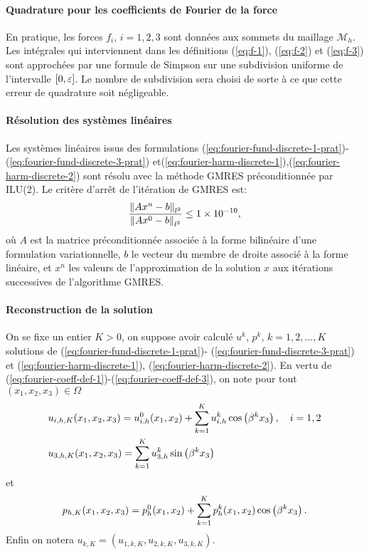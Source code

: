 \paragraph{Quadrature pour les coefficients de Fourier de la force}
En pratique, les forces $f_i$, $i = 1,2,3$ sont données aux sommets du
maillage $\mathcal M_h$. Les intégrales qui interviennent dans les
définitions (\ref{eq:f-1}), (\ref{eq:f-2}) et (\ref{eq:f-3}) sont
approchées par une formule de Simpson sur une subdivision uniforme de
l'intervalle $[0, \varepsilon]$. Le nombre de subdivision sera choisi
de sorte à ce que cette erreur de quadrature soit négligeable.

\paragraph{Résolution des systèmes linéaires}
Les systèmes linéaires issus des formulations
(\ref{eq:fourier-fund-discrete-1-prat})-(\ref{eq:fourier-fund-discrete-3-prat})
et(\ref{eq:fourier-harm-discrete-1}),(\ref{eq:fourier-harm-discrete-2})
sont résolu avec la méthode GMRES préconditionnée par ILU(2). Le
critère d'arrêt de l'itération de GMRES est:
\begin{equation}
  \frac{\left\lVert Ax^n - b \right\rVert_{l^2}}{\left\lVert Ax^0 - b \right\rVert_{l^2}} \leq \num{1e-10},
\end{equation}
où $A$ est la matrice préconditionnée associée à la forme bilinéaire
d'une formulation
variationnelle, $b$ le vecteur du membre de droite associé à la
forme linéaire, et $x^n$ les valeurs de l'approximation de la
solution $x$ aux itérations successives de l'algorithme GMRES.

\paragraph{Reconstruction de la solution}
On se fixe un entier $K > 0$, on suppose avoir calculé $u^k$, $p^k$, $k
= 1, 2,\dots, K$ solutions de (\ref{eq:fourier-fund-discrete-1-prat})-%
(\ref{eq:fourier-fund-discrete-3-prat}) et
(\ref{eq:fourier-harm-discrete-1}),
(\ref{eq:fourier-harm-discrete-2}). En vertu de
(\ref{eq:fourier-coeff-def-1})-(\ref{eq:fourier-coeff-def-3}), on note
pour tout $(x_1, x_2, x_3)\in \Omega$
\begin{align}
  &u_{i,h,K}(x_1, x_2, x_3) = u_{i,h}^0(x_1, x_2) + \sum_{k = 1}^K
  u_{i,h}^k \cos\left( \beta^k x_3 \right),\quad i = 1,2\label{eq:u-h-12}\\
  &u_{3,h,K}(x_1, x_2, x_3) = \sum_{k = 1}^K
  u_{3,h}^k \sin\left( \beta^k x_3 \right)\label{eq:u-h-3}
\end{align}
et
\begin{align}
  p_{h,K}(x_1, x_2, x_3) = p_h^0(x_1, x_2) + \sum_{k = 1}^K p_h^k(x_1,
  x_2) \cos\left( \beta^k x_3 \right).
\end{align}
Enfin on notera $u_{k,K} = (u_{1,k,K}, u_{2,k,K}, u_{3,k,K})$.
